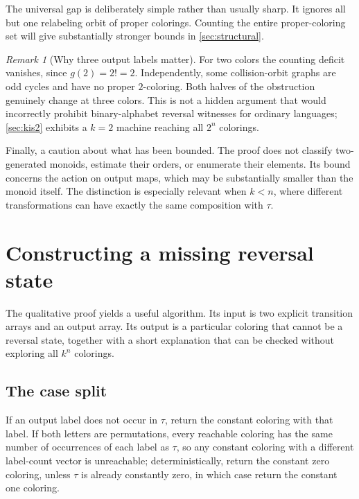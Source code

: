 \documentclass[11pt,a4paper]{article}
\numberwithin{equation}{section}
\theoremstyle{definition}
\theoremstyle{remark}
\newtheorem{remark}[theorem]{Remark}
\begin{document}
The universal gap is deliberately simple rather than usually sharp. It
ignores all but one relabeling orbit of proper colorings. Counting the entire
proper-coloring set will give substantially stronger bounds in
\cref{sec:structural}.

\begin{remark}[Why three output labels matter]\label{rem:whythree}
For two colors the counting deficit vanishes, since $g(2)=2!=2$. Independently,
some collision-orbit graphs are odd cycles and have no proper $2$-coloring.
Both halves of the obstruction genuinely change at three colors. This is not
a hidden argument that would incorrectly prohibit binary-alphabet reversal
witnesses for ordinary languages; \cref{sec:kis2} exhibits a $k=2$ machine
reaching all $2^n$ colorings.
\end{remark}

Finally, a caution about what has been bounded. The proof does not classify
two-generated monoids, estimate their orders, or enumerate their elements.
Its bound concerns the action on output maps, which may be substantially
smaller than the monoid itself. The distinction is especially relevant when
$k<n$, where different transformations can have exactly the same composition
with $\tau$.

\section{Constructing a missing reversal state}\label{sec:algorithm}

The qualitative proof yields a useful algorithm. Its input is two explicit
transition arrays and an output array. Its output is a particular coloring
that cannot be a reversal state, together with a short explanation that can
be checked without exploring all $k^n$ colorings.

\subsection{The case split}

If an output label does not occur in $\tau$, return the constant coloring
with that label. If both letters are permutations, every reachable coloring
has the same number of occurrences of each label as $\tau$, so any constant
coloring with a different label-count vector is unreachable; deterministically,
return the constant zero coloring, unless $\tau$ is already constantly zero,
in which case return the constant one coloring.
\end{document}
